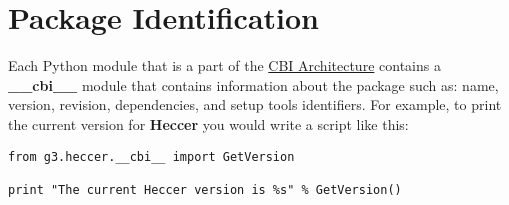 \documentclass[12pt]{article}
\begin{document}
\section*{Package Identification}

	Each Python module that is a part of the \href{../cbi-architecture/cbi-architecture.tex}{CBI Architecture} contains a {\bf \_\_cbi\_\_} module that contains information about the package such as: name, version, revision, dependencies, and setup tools identifiers. For example, to print the current version for {\bf Heccer} you would write a script like this:
	
\begin{verbatim}
from g3.heccer.__cbi__ import GetVersion

print "The current Heccer version is %s" % GetVersion()

\end{verbatim}
\end{document}
